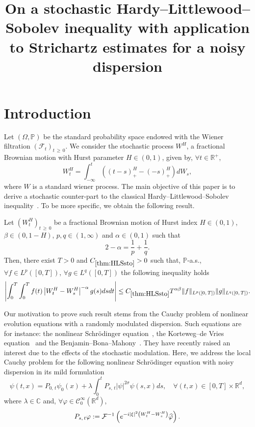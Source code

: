 \documentclass[AHL,Unicode,longabstracts,published]{cedram}
\title[On a stochastic Hardy--Littlewood--Sobolev inequality]{On a stochastic Hardy--Littlewood--Sobolev inequality with application to Strichartz estimates for a noisy dispersion}
\author[\initial{R.} \lastname{Duboscq}]{\firstname{Romain} \lastname{Duboscq}}
\author[\initial{A.} \lastname{Réveillac}]{\firstname{Anthony} \lastname{Réveillac}}
\newcommand{\bbP}{\mathbb{P}}
\newcommand{\bbR}{\mathbb{R}}
\newcommand{\bbC}{\mathbb{C}}
\newcommand{\clC}{\mathcal{C}}
\newcommand{\clF}{\mathcal{F}}
\let\oldhat\hat
\renewcommand*{\hat}[1]{\mathchoice{\widehat{#1}}{\widehat{#1}}{\oldhat{#1}}{\oldhat{#1}}}
\let\oldforall\forall
\renewcommand*{\forall}{\mathrel{\oldforall}}
\begin{document}
\maketitle

\section{Introduction}

Let $(\Omega, \bbP)$ be the standard probability space endowed with the Wiener filtration $(\clF_t)_{t\,\geq\,0}$. We consider the stochastic process $W^H$, a fractional Brownian motion with Hurst parameter $H\in(0,1)$, given by, $\forall t\in\bbR^+$,
\[
W^H_t = \int_{-\infty}^t\left((t-s)_+^{H}-(-s)_+^{H}\right)dW_s,
\]
where $W$ is a standard wiener process. The main objective of this paper is to derive a stochastic counter-part to the classical Hardy--Littlewood--Sobolev inequality~\cite{hardy1928some,hardy1932some,sobolev1938theorem}. To be more specific, we obtain the following result.

\begin{theo}\label{thm:HLSsto}
Let $(W^H_t)_{t\,\geq\,0}$ be a fractional Brownian motion of Hurst index $H\in (0,1)$, $\beta\in (0,1-H)$, $p,q \in (1,\infty)$ and $\alpha\in (0,1)$ such that
\[
2 - \alpha = \frac1p+\frac1q.
\]
Then, there exist $T>0$ and $C_{\ref{thm:HLSsto}}>0$ such that, $\bbP$-a.s., $\forall f\in L^p([0,T])$, $\forall g\in L^q([0,T])$ the following inequality holds
\begin{equation}\label{ineq:HLSsto}
\left|\int_0^T\int_0^T f(t)\left|W^{H}_t-W^{H}_s\right|^{-\alpha}g(s) ds dt\right|\leq C_{\ref{thm:HLSsto}} T^{\alpha\beta}\|f\|_{L^p\left([0,\,T]\right)}\|g\|_{L^q\left([0,\,T]\right)}.
\end{equation}
\end{theo}

Our motivation to prove such result stems from the Cauchy problem of nonlinear evolution equations with a randomly modulated dispersion. Such equations are for instance: the nonlinear Schr\"odinger equation~\cite{belaouar2015numerical,chouk2015nonlinear,de2010nonlinear,debussche20111d}, the Korteweg--de Vries equation~\cite{chouk2015nonlinear} and the Benjamin--Bona--Mahony~\cite{chen2017generalized}. They have recently raised an interest due to the effects of the stochastic modulation. Here, we address the local Cauchy problem for the following nonlinear Schr\"odinger equation with noisy dispersion in its mild formulation
\begin{equation}\label{eq:main}
\psi(t,x) = P_{0,\,t} \psi_0(x) + \lambda \int_0^t P_{s,\,t} |\psi|^{2\sigma} \psi(s,x)ds,\quad \forall (t,x)\in[0,T]\times\bbR^d,
\end{equation}
where $\lambda \in\bbC$ and, $\forall \varphi\in\clC^{\infty}_0(\bbR^d)$,
\[
P_{s,\,t}\varphi : = \clF^{-1}\left(e^{-i|\xi|^2\left(W^H_t-W^H_s\right)} \hat{\varphi}\right).
\]
\end{document}
